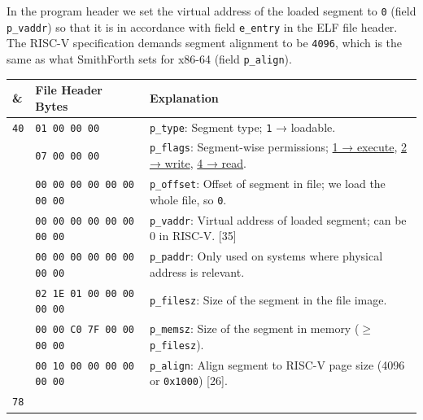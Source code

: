\documentclass[a4paper,12pt,final]{article}
\makeatletter
\newcommand{\citeprocitem}[2]{\hyper@linkstart{cite}{citeproc_bib_item_#1}#2\hyper@linkend}
\makeatother
\begin{document}
In the program header we set the virtual address of the loaded segment
to \texttt{0} (field \texttt{p\_vaddr}) so that it is in accordance with field
\texttt{e\_entry} in the ELF file header.  The RISC-V specification demands
segment alignment to be \texttt{4096}, which is the same as what SmithForth
sets for x86-64 (field \texttt{p\_align}).

\begin{table}[!htbp] \begin{adjustwidth}{-1cm}{-1cm} \fontsize{9}{10.800000}\selectfont
\begin{center}
\begin{tabular}{l|l|l}
\textbf{\&} & \textbf{File Header Bytes} & \textbf{Explanation}\\[0pt]
\hline
\texttt{40} & \hspace{0.000000em}​\texttt{01 00 00 00} & \texttt{p\_type}: Segment type; \texttt{1} → loadable.\\[0pt]
 & \hspace{6.318000em}​\texttt{07 00 00 00} & \texttt{p\_flags}: Segment-wise permissions; \uline{1 → execute}, \uline{2 → write}, \uline{4 → read}.\\[0pt]
 & \hspace{0.000000em}​\texttt{00 00 00 00 00 00 00 00} & \texttt{p\_offset}: Offset of segment in file; we load the whole file, so \texttt{0}.\\[0pt]
 & \hspace{0.000000em}​\texttt{00 00 00 00 00 00 00 00} & \texttt{p\_vaddr}: Virtual address of loaded segment; can be 0 in RISC-V. \citeprocitem{35}{[35]}\\[0pt]
 & \hspace{0.000000em}​\texttt{00 00 00 00 00 00 00 00} & \texttt{p\_paddr}: Only used on systems where physical address is relevant.\\[0pt]
 & \hspace{0.000000em}​\texttt{02 1E 01 00 00 00 00 00} & \texttt{p\_filesz}: Size of the segment in the file image.\\[0pt]
 & \hspace{0.000000em}​\texttt{00 00 C0 7F 00 00 00 00} & \texttt{p\_memsz}: Size of the segment in memory (\(\ge\) \texttt{p\_filesz}).\\[0pt]
 & \hspace{0.000000em}​\texttt{00 10 00 00 00 00 00 00} & \texttt{p\_align}: Align segment to RISC-V page size (4096 or \texttt{0x1000}) \citeprocitem{26}{[26]}.\\[0pt]
\hline
\texttt{78} &  & \\[0pt]
\end{tabular}

\end{center}
\normalsize \end{adjustwidth} \end{table} \vspace{0}
\clearpage
\end{document}

